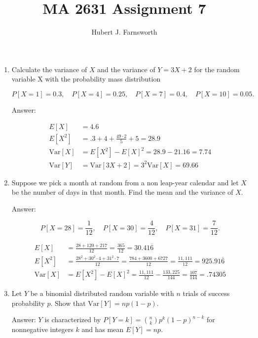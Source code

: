 \documentclass{article}
\title{MA 2631 Assignment 7}
\author{Hubert J. Farnsworth}
\begin{document}
\maketitle

\begin{enumerate}

\item

Calculate the variance of $X$ and the variance of $Y = 3X+2$ for the random variable X with the probability mass distribution

$$
P [X = 1] = 0.3, \quad P [X = 4] = 0.25, \quad P [X = 7] = 0.4, \quad P [X = 10] = 0.05.
$$

Answer:

\begin{align*}
E[X] &= 4.6\\
E[X^2] &= .3 + 4  + \frac{49 \cdot 2}{5} + 5 = 28.9\\
\text{Var}[X] &= E[X^2] - E[X]^2 = 28.9 - 21.16 = \boxed{7.74}\\
\text{Var}[Y] &= \text{Var}[3X+2] = 3^2 \text{Var}[X] = \boxed{69.66}
\end{align*}

\newpage
\item

Suppose we pick a month at random from a non leap-year calendar and let $X$ be the number of days in that month. Find the mean and the variance of $X$.

Answer:

$$
P[X = 28] = \frac{1}{12}, \quad P[X=30] = \frac{4}{12}, \quad P[X = 31] = \frac{7}{12}.
$$

\begin{align*}
E[X] &= \frac{28 + 120 + 217}{12} = \boxed{\frac{365}{12} = 30.41\overline{6}}\\
E[X^2] &= \frac{28^2 + 30^2\cdot 4 + 31^2 \cdot 7}{12} 
= \frac{784 + 3600 + 6727}{12} = \frac{11,111}{12} = 925.91\overline{6} \\
\text{Var}[X] &= E[X^2] - E[X]^2 = \frac{11,111}{12} - \frac{133,225}{144} = \boxed{\frac{107}{144} = .7430\overline{5}}
\end{align*}

\newpage
\item

Let $Y$ be a binomial distributed random variable with $n$ trials of success probability $p$. Show that $\text{Var}[Y] = np(1-p)$. 

Answer: $Y$ is characterized by $P[Y = k] = \binom{n}{k}p^k(1-p)^{n-k}$ for nonnegative integers $k$ and has mean $E[Y] = np$.


\end{enumerate}
\end{document}
